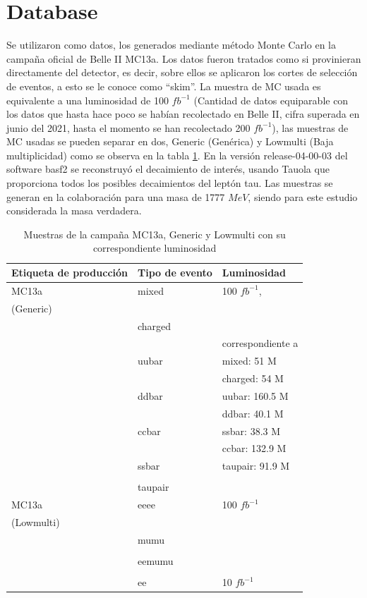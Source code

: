 \section{Database}

Se utilizaron como datos, los generados mediante método Monte Carlo en la campaña oficial de Belle II MC13a. Los datos fueron tratados como si provinieran directamente del detector, es decir, sobre ellos se aplicaron los cortes de selección de eventos, a esto se le conoce como ``skim''. La muestra de MC usada es equivalente a una luminosidad de 100 \(fb^{-1}\) (Cantidad de datos equiparable con los datos que hasta hace poco se habían recolectado en Belle II, cifra superada en junio del 2021, hasta el momento se han recolectado 200 \(fb^{-1}\)), las muestras de MC usadas se pueden separar en dos, Generic (Genérica) y Lowmulti (Baja multiplicidad) como se observa en la tabla \ref{table:skim}. En la versión release-04-00-03 del software basf2 se reconstruyó el decaimiento de interés, usando Tauola que proporciona todos los posibles decaimientos del leptón tau. Las muestras se generan en la colaboración para una masa de 1777 \(MeV\), siendo para este estudio considerada la masa verdadera.
\begin{table}[h!]
\centering
 \begin{tabular}{|| p{3cm} | p{3cm} | p{3.5cm} ||} 
 \hline
 Etiqueta de producción & Tipo de evento & Luminosidad \\ [0.5ex] 
 \hline\hline
 MC13a  & mixed & 100 \(fb^{-1}\), \\
 (Generic)& &\\
 & charged &\\
 & & correspondiente a\\
 & uubar & mixed: 51 M\\
 & & charged: 54 M\\
 & ddbar & uubar: 160.5 M\\ 
 & & ddbar: 40.1 M\\
 & ccbar & ssbar: 38.3 M\\
 & & ccbar: 132.9 M\\
 & ssbar & taupair: 91.9 M\\
 & &\\
 & taupair &\\
 \hline
 MC13a  & eeee & 100 \(fb^{-1}\) \\
 (Lowmulti)& &\\
 & mumu &\\
 & & \\
 & eemumu &\\
 &\hline&\hline \\
 & ee & 10 \(fb^{-1}\)\\
 \hline
 \end{tabular}
 \caption{\small{Muestras de la campaña MC13a, Generic y Lowmulti con su correspondiente luminosidad}}\label{table:skim}
\end{table}
